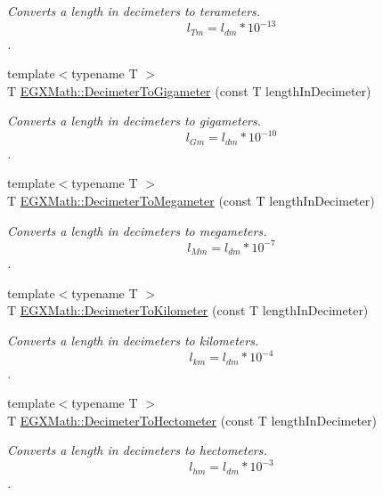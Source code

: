 \begin{DoxyCompactItemize}
\begin{DoxyCompactList}\small\item\em Converts a length in decimeters to terameters. \[ l_{Tm}=l_{dm} * 10^{-13} \]. \end{DoxyCompactList}\item 
{\footnotesize template$<$typename T $>$ }\\T \mbox{\hyperlink{group___e_g_x_math-_conversions-_length_conversions-_s_i-_decimeter-_s_i_gab3fcc85ff18a685480d182d95da4d60b}{E\+G\+X\+Math\+::\+Decimeter\+To\+Gigameter}} (const T length\+In\+Decimeter)
\begin{DoxyCompactList}\small\item\em Converts a length in decimeters to gigameters. \[ l_{Gm}=l_{dm} * 10^{-10} \]. \end{DoxyCompactList}\item 
{\footnotesize template$<$typename T $>$ }\\T \mbox{\hyperlink{group___e_g_x_math-_conversions-_length_conversions-_s_i-_decimeter-_s_i_ga093ff7a928de0bc92d2dd57c2c3d0a60}{E\+G\+X\+Math\+::\+Decimeter\+To\+Megameter}} (const T length\+In\+Decimeter)
\begin{DoxyCompactList}\small\item\em Converts a length in decimeters to megameters. \[ l_{Mm}=l_{dm} * 10^{-7} \]. \end{DoxyCompactList}\item 
{\footnotesize template$<$typename T $>$ }\\T \mbox{\hyperlink{group___e_g_x_math-_conversions-_length_conversions-_s_i-_decimeter-_s_i_gaad90a14189b6602a87b449adb1cd5e82}{E\+G\+X\+Math\+::\+Decimeter\+To\+Kilometer}} (const T length\+In\+Decimeter)
\begin{DoxyCompactList}\small\item\em Converts a length in decimeters to kilometers. \[ l_{km}=l_{dm} * 10^{-4} \]. \end{DoxyCompactList}\item 
{\footnotesize template$<$typename T $>$ }\\T \mbox{\hyperlink{group___e_g_x_math-_conversions-_length_conversions-_s_i-_decimeter-_s_i_gaa84a9ad8f41f664e41c4c390186dfa1b}{E\+G\+X\+Math\+::\+Decimeter\+To\+Hectometer}} (const T length\+In\+Decimeter)
\begin{DoxyCompactList}\small\item\em Converts a length in decimeters to hectometers. \[ l_{hm}=l_{dm} * 10^{-3} \]. \end{DoxyCompactList}\item 

\end{DoxyCompactItemize}

